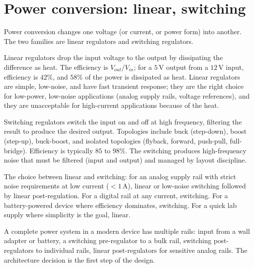 \section{Power conversion: linear, switching}

Power conversion changes one voltage (or current, or power form) into another. The two families are linear regulators and switching regulators.

Linear regulators drop the input voltage to the output by dissipating the difference as heat. The efficiency is $V_{out}/V_{in}$; for a $5\,\text{V}$ output from a $12\,\text{V}$ input, efficiency is $42\%$, and $58\%$ of the power is dissipated as heat. Linear regulators are simple, low-noise, and have fast transient response; they are the right choice for low-power, low-noise applications (analog supply rails, voltage references), and they are unacceptable for high-current applications because of the heat.

Switching regulators switch the input on and off at high frequency, filtering the result to produce the desired output. Topologies include buck (step-down), boost (step-up), buck-boost, and isolated topologies (flyback, forward, push-pull, full-bridge). Efficiency is typically $85$ to $98\%$. The switching produces high-frequency noise that must be filtered (input and output) and managed by layout discipline.

The choice between linear and switching: for an analog supply rail with strict noise requirements at low current ($< 1\,\text{A}$), linear or low-noise switching followed by linear post-regulation. For a digital rail at any current, switching. For a battery-powered device where efficiency dominates, switching. For a quick lab supply where simplicity is the goal, linear.

A complete power system in a modern device has multiple rails: input from a wall adapter or battery, a switching pre-regulator to a bulk rail, switching post-regulators to individual rails, linear post-regulators for sensitive analog rails. The architecture decision is the first step of the design.

